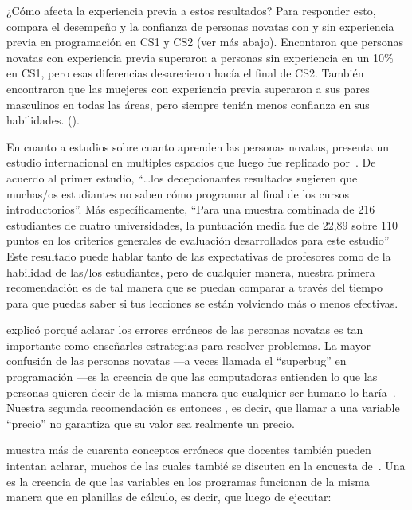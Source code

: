 ¿Cómo afecta la experiencia previa a estos resultados?
Para responder esto, 
\cite{Wilc2018} compara el desempeño y la confianza de personas novatas
con y sin experiencia previa en programación en CS1 y CS2 (ver más abajo).
Encontaron que personas novatas con experiencia previa superaron a personas sin experiencia en un 10\% en CS1,
pero esas diferencias desarecieron hacía el final de CS2.
También encontraron que las muejeres con experiencia previa superaron a sus pares masculinos en todas las áreas,
pero siempre tenián menos confianza en sus habilidades. ().

En cuanto a estudios sobre cuanto aprenden las personas novatas,
\cite{McCr2001} presenta un estudio internacional en multiples espacios que luego fue replicado por~\cite{Utti2013}.
De acuerdo al primer estudio,
``{\ldots}los decepcionantes resultados sugieren que
muchas/os estudiantes no saben cómo programar al final de los cursos introductorios''.
Más específicamente,
``Para una muestra combinada de 216 estudiantes de cuatro universidades,
la puntuación media fue de 22,89 sobre 110 puntos en los criterios generales de evaluación desarrollados para este estudio''
Este resultado puede hablar tanto de las expectativas de profesores como de la habilidad de las/los estudiantes,
pero de cualquier manera,
nuestra primera recomendación es 
de tal manera que se puedan comparar a través del tiempo para que puedas saber si tus lecciones se están volviendo más o menos efectivas.


 explicó porqué aclarar los errores erróneos de las personas novatas es tan importante como enseñarles
estrategias para resolver problemas.
La mayor confusión de las personas novatas ---a veces llamada el ``superbug'' en programación ---es
la creencia de que las computadoras entienden lo que las personas quieren decir de la misma manera que cualquier ser humano lo haría~\cite{Pea1986}.
Nuestra segunda recomendación es entonces ,
es decir, que llamar a una variable ``precio'' no garantiza que su valor sea realmente un precio.

\cite{Sorv2018}  muestra más de cuarenta conceptos erróneos que docentes también pueden intentan aclarar,
muchos de las cuales tambié se discuten en la encuesta de~\cite{Qian2017}.
Una es la creencia de que las variables en los programas funcionan de la misma manera que en planillas de cálculo,
es decir, que luego de ejecutar:

